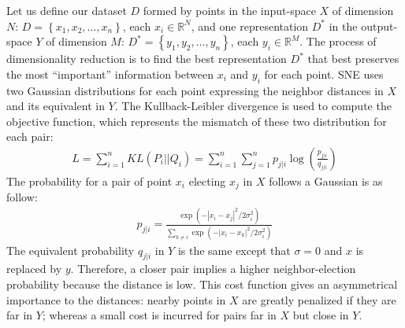 \documentclass[a4paper,12pt]{report}
\newcommand{\R}{\mathbb{R}}
\begin{document}
Let us define our dataset $D$ formed by points in the input-space $X$ of dimension $N$: $D = \left\{ x_1, x_2, \dots, x_n \right\}$, each $x_i \in \R^N$, and one representation $D^\ast$ in the output-space $Y$ of dimension $M$: $D^\ast = \left\{ y_1, y_2, \dots, y_n \right\}$, each $y_i \in \R^M$.
The process of dimensionality reduction is to find the best representation $D^\ast$ that best preserves the most ``important'' information between $x_i$ and $y_i$ for each point.
SNE uses two Gaussian distributions for each point expressing the neighbor distances in $X$ and its equivalent in $Y$.
The Kullback-Leibler divergence is used to compute the objective function, which represents the mismatch of these two distribution for each pair:
\begin{eqnarray}
    L = \sum_{i=1}^n KL(P_i || Q_i) = \sum_{i=1}^n \sum_{j=1}^n p_{j|i} \log\left(\frac{p_{j|i}}{q_{j|i}}\right)
\end{eqnarray}
The probability for a pair of point $x_i$ electing $x_j$ in $X$ follows a Gaussian is as follow:
\begin{eqnarray}
    p_{j|i} = \frac{\exp(-|x_i - x_j|^2 / 2 \sigma_i^2)}{\sum_{k \not = i} \exp(-|x_i - x_k|^2 / 2 \sigma_i^2 )}
\end{eqnarray}
The equivalent probability $q_{j|i}$ in $Y$ is the same except that $\sigma = 0$ and $x$ is replaced by $y$.
Therefore, a closer pair implies a higher neighbor-election probability because the distance is low.
This cost function gives an asymmetrical importance to the distances: nearby points in $X$ are greatly penalized if they are far in $Y$; whereas a small cost is incurred for pairs far in $X$ but close in $Y$.
\end{document}
